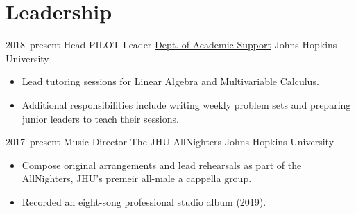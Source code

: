 \section{Leadership}

\cventry
{2018--present}
{Head PILOT Leader}
{\href{https://academicsupport.jhu.edu/pilot/}{Dept. of Academic Support}}
{Johns Hopkins University}
{}
{
\begin{itemize}
    \item Lead tutoring sessions for Linear Algebra and Multivariable Calculus.
    \item Additional responsibilities include writing weekly problem sets and preparing junior leaders to teach their sessions.
\end{itemize}
}

\cventry
{2017--present}
{Music Director}
{The JHU AllNighters}
{Johns Hopkins University}
{}
{
\begin{itemize}
    \item Compose original arrangements and lead rehearsals as part of the AllNighters, JHU's premeir all-male a cappella group.
    \item Recorded an eight-song professional studio album (2019).
\end{itemize}
}